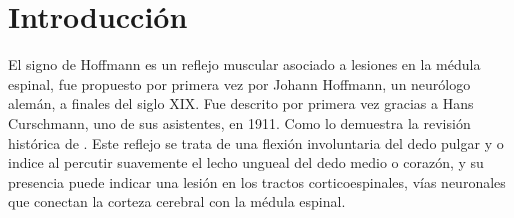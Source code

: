 \section{Introducción}
El signo de Hoffmann es un reflejo muscular asociado a lesiones en la médula espinal, fue propuesto por primera vez por Johann Hoffmann, un neurólogo alemán, a finales del siglo XIX. Fue descrito por primera vez gracias a Hans Curschmann, uno de sus asistentes, en 1911. Como lo demuestra la revisión histórica de \cite{ BENDHEIM}. Este reflejo se trata de una flexión involuntaria del dedo pulgar y o indice al percutir suavemente el lecho ungueal del dedo medio o corazón, y su presencia puede indicar una lesión en los tractos corticoespinales, vías neuronales que conectan la corteza cerebral con la médula espinal.